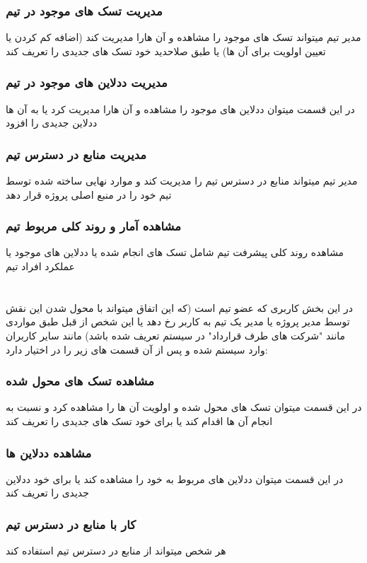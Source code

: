 \documentclass[10pt,a4paper]{article}
\begin{document}
\section*{
	مدیریت تسک های موجود در تیم
}
مدیر تیم میتواند تسک های موجود  را مشاهده و آن هارا مدیریت کند (اضافه کم کردن یا تعیین اولویت برای آن ها) یا طبق صلاحدید خود تسک های جدیدی را تعریف کند
\section*{
	مدیریت ددلاین های موجود در تیم
}
در این قسمت میتوان ددلاین های موجود را مشاهده و آن هارا مدیریت کرد یا به آن ها ددلاین جدیدی را افزود
\section*{
	مدیریت منابع در دسترس تیم
}
مدیر تیم میتواند منابع در دسترس تیم را مدیریت کند و موارد نهایی ساخته شده توسط تیم خود را در منبع اصلی پروژه قرار دهد 
\section*{
مشاهده آمار و روند کلی مربوط تیم 
}
مشاهده روند کلی پیشرفت تیم شامل تسک های انجام شده یا ددلاین های موجود یا عملکرد افراد تیم
\part{
}
در این بخش کاربری که عضو تیم است (که این اتفاق میتواند با محول شدن این نقش توسط مدیر پروژه یا مدیر یک تیم به کاربر رخ دهد یا این شخص از قبل طبق مواردی مانند "شرکت های طرف قرارداد" در سیستم تعریف شده باشد) مانند سایر کاربران وارد سیستم شده و پس از آن قسمت های زیر را در اختیار دارد:
\section*{
	مشاهده تسک های محول شده
}
در این قسمت میتوان تسک های محول شده و اولویت آن ها را مشاهده کرد و نسبت به انجام آن ها اقدام کند یا برای خود تسک های جدیدی را تعریف کند
\section*{
	مشاهده ددلاین ها
}
در این قسمت میتوان ددلاین های مربوط به خود را مشاهده کند یا برای خود ددلاین جدیدی را تعریف کند
\section*{
	کار با منابع در دسترس تیم
}
هر شخص میتواند از منابع در دسترس تیم استفاده کند
\end{document}
